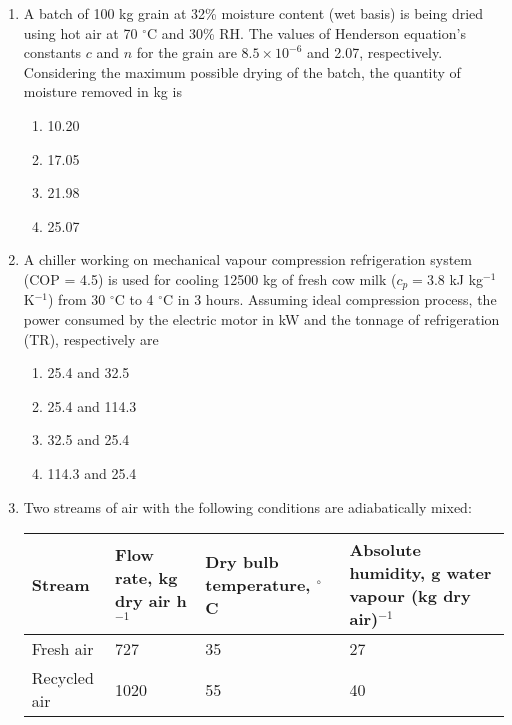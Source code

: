 \documentclass[12pt]{article}
\begin{document}
\begin{enumerate}[label =Q.\arabic*,start=26]
		\item A batch of 100 kg grain at 32\% moisture content (wet basis) is being dried using hot air at 70 $^\circ$C and 30\% RH. The values of Henderson equation’s constants $c$ and $n$ for the grain are $8.5 \times 10^{-6}$ and 2.07, respectively. Considering the maximum possible drying of the batch, the quantity of moisture removed in kg is
			\begin{multicols}{4}
				\begin{enumerate}[label=(\Alph*)]
					\item 10.20
					\item 17.05
					\item 21.98
					\item 25.07
				\end{enumerate}
			\end{multicols}

		\item A chiller working on mechanical vapour compression refrigeration system (COP = 4.5) is used for cooling 12500 kg of fresh cow milk ($c_p = 3.8$ kJ kg$^{-1}$ K$^{-1}$) from 30 $^\circ$C to 4 $^\circ$C in 3 hours. Assuming ideal compression process, the power consumed by the electric motor in kW and the tonnage of refrigeration (TR), respectively are
			\begin{multicols}{2}
				\begin{enumerate}[label=(\Alph*)]
					\item 25.4 and 32.5
					\item 25.4 and 114.3
					\item 32.5 and 25.4
					\item 114.3 and 25.4
				\end{enumerate}
			\end{multicols}
		\item Two streams of air with the following conditions are adiabatically mixed:

			\begin{tabular}{|p{2cm}|p{2.5cm}|p{2.5cm}|p{4cm}|}
				\hline
				Stream & Flow rate, kg dry air h$^{-1}$ & Dry bulb temperature, $^\circ$C & Absolute humidity, g water vapour (kg dry air)$^{-1}$ \\
				\hline
				Fresh air & 727 & 35 & 27 \\
				\hline
				Recycled air & 1020 & 55 & 40 \\
				\hline
			\end{tabular}


\end{enumerate}
\end{document}
